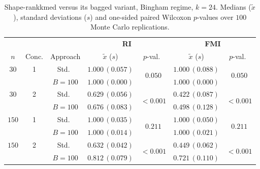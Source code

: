 \begin{table}[h]
\centering
\caption{Shape-rankkmed versus its bagged variant, Bingham regime, $k=24$. Medians ($\tilde x$), standard deviations ($s$) and one-sided paired Wilcoxon $p$-values over $100$ Monte Carlo replications.}
\label{tab:rkm-bing-k24}
\footnotesize
\begin{tabular}{cc c cc cc}
\toprule
& & & \multicolumn{2}{c}{\textbf{RI}} & \multicolumn{2}{c}{\textbf{FMI}} \\
\cmidrule(lr){4-5}\cmidrule(lr){6-7}
$n$ & Conc. & Approach & $\tilde x$ ($s$) & $p$-val.\ & $\tilde x$ ($s$) & $p$-val.\ \\
\midrule
$30$ & 1 & Std.\ & $1.000\,(0.057)$ & \multirow{2}{*}{$0.050$} & $1.000\,(0.088)$ & \multirow{2}{*}{$0.050$} \\
     &   & $B{=}100$ & $1.000\,(0.000)$ & & $1.000\,(0.000)$ & \\
$30$ & 2 & Std.\ & $0.629\,(0.056)$ & \multirow{2}{*}{$\mathbf{<\!0.001}$} & $0.422\,(0.087)$ & \multirow{2}{*}{$\mathbf{<\!0.001}$} \\
     &   & $B{=}100$ & $0.676\,(0.083)$ & & $0.498\,(0.128)$ & \\
$150$ & 1 & Std.\ & $1.000\,(0.035)$ & \multirow{2}{*}{$0.211$} & $1.000\,(0.050)$ & \multirow{2}{*}{$0.211$} \\
     &   & $B{=}100$ & $1.000\,(0.014)$ & & $1.000\,(0.021)$ & \\
$150$ & 2 & Std.\ & $0.632\,(0.042)$ & \multirow{2}{*}{$\mathbf{<\!0.001}$} & $0.449\,(0.062)$ & \multirow{2}{*}{$\mathbf{<\!0.001}$} \\
     &   & $B{=}100$ & $0.812\,(0.079)$ & & $0.721\,(0.110)$ & \\
\bottomrule
\end{tabular}
\end{table}

